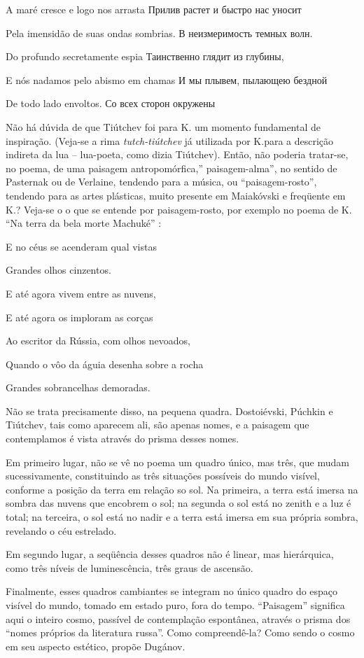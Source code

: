 A maré cresce e logo nos arrasta Прилив растет и быстро нас уносит

Pela imensidão de suas ondas sombrias. В неизмеримость темных волн.

Do profundo secretamente espia Таинственно глядит из глубины,

E nós nadamos pelo abismo em chamas И мы плывем, пылающею бездной

De todo lado envoltos. Со всех сторон окружены

Não há dúvida de que Tiútchev foi para K. um momento fundamental de
inspiração. (Veja-se a rima \emph{tutch-tiútchev} já utilizada por
K.para a descrição indireta da lua -- lua-poeta, como dizia Tiútchev).
Então, não poderia tratar-se, no poema, de uma paisagem
antropomórfica,'' paisagem-alma'', no sentido de Pasternak ou de
Verlaine, tendendo para a música, ou ``paisagem-rosto'', tendendo para
as artes plásticas, muito presente em Maiakóvski e freqüente em K.?
Veja-se o o que se entende por paisagem-rosto, por exemplo no poema de
K. ``Na terra da bela morte Machuké'' :

E no céus se acenderam qual vistas

Grandes olhos cinzentos.

E até agora vivem entre as nuvens,

E até agora os imploram as corças

Ao escritor da Rússia, com olhos nevoados,

Quando o vôo da águia desenha sobre a rocha

Grandes sobrancelhas demoradas.

Não se trata precisamente disso, na pequena quadra. Dostoiévski, Púchkin
e Tiútchev, tais como aparecem ali, são apenas nomes, e a paisagem que
contemplamos é vista através do prisma desses nomes.

Em primeiro lugar, não se vê no poema um quadro único, mas três, que
mudam sucessivamente, constituindo as três situações possíveis do mundo
visível, conforme a posição da terra em relação so sol. Na primeira, a
terra está imersa na sombra das nuvens que encobrem o sol; na segunda o
sol está no zenith e a luz é total; na terceira, o sol está no nadir e a
terra está imersa em sua própria sombra, revelando o céu estrelado.

Em segundo lugar, a seqüência desses quadros não é linear, mas
hierárquica, como três níveis de luminescência, três graus de ascensão.

Finalmente, esses quadros cambiantes se integram no único quadro do
espaço visível do mundo, tomado em estado puro, fora do tempo.
``Paisagem'' significa aqui o inteiro cosmo, passível de contemplação
espontânea, através o prisma dos ``nomes próprios da literatura russa''.
Como compreendê-la? Como sendo o cosmo em seu aspecto estético, propõe
Dugánov.

